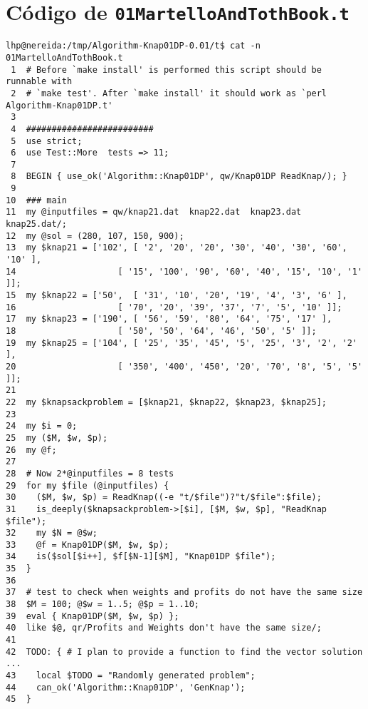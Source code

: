 \documentclass[11pt,a4paper,oneside,onecolumn]{book}
\begin{document}
\chapter*{Código de {\tt 01MartelloAndTothBook.t}}
\label{apendice:01martello}
\begin{verbatim}
lhp@nereida:/tmp/Algorithm-Knap01DP-0.01/t$ cat -n 01MartelloAndTothBook.t
 1  # Before `make install' is performed this script should be runnable with
 2  # `make test'. After `make install' it should work as `perl Algorithm-Knap01DP.t'
 3
 4  #########################
 5  use strict;
 6  use Test::More  tests => 11;
 7
 8  BEGIN { use_ok('Algorithm::Knap01DP', qw/Knap01DP ReadKnap/); }
 9
10  ### main
11  my @inputfiles = qw/knap21.dat  knap22.dat  knap23.dat  knap25.dat/;
12  my @sol = (280, 107, 150, 900);
13  my $knap21 = ['102', [ '2', '20', '20', '30', '40', '30', '60', '10' ],
14                    [ '15', '100', '90', '60', '40', '15', '10', '1' ]];
15  my $knap22 = ['50',  [ '31', '10', '20', '19', '4', '3', '6' ],
16                    [ '70', '20', '39', '37', '7', '5', '10' ]];
17  my $knap23 = ['190', [ '56', '59', '80', '64', '75', '17' ],
18                    [ '50', '50', '64', '46', '50', '5' ]];
19  my $knap25 = ['104', [ '25', '35', '45', '5', '25', '3', '2', '2' ],
20                    [ '350', '400', '450', '20', '70', '8', '5', '5' ]];
21
22  my $knapsackproblem = [$knap21, $knap22, $knap23, $knap25];
23
24  my $i = 0;
25  my ($M, $w, $p);
26  my @f;
27
28  # Now 2*@inputfiles = 8 tests
29  for my $file (@inputfiles) {
30    ($M, $w, $p) = ReadKnap((-e "t/$file")?"t/$file":$file);
31    is_deeply($knapsackproblem->[$i], [$M, $w, $p], "ReadKnap $file");
32    my $N = @$w;
33    @f = Knap01DP($M, $w, $p);
34    is($sol[$i++], $f[$N-1][$M], "Knap01DP $file");
35  }
36
37  # test to check when weights and profits do not have the same size
38  $M = 100; @$w = 1..5; @$p = 1..10;
39  eval { Knap01DP($M, $w, $p) };
40  like $@, qr/Profits and Weights don't have the same size/;
41
42  TODO: { # I plan to provide a function to find the vector solution ...
43    local $TODO = "Randomly generated problem";
44    can_ok('Algorithm::Knap01DP', 'GenKnap');
45  }
\end{verbatim}


\printindex
\label{indicealfabetico}



\end{document}
